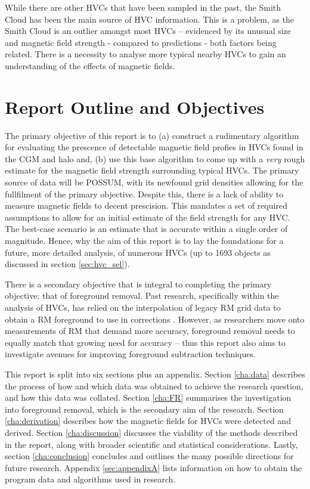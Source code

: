 While there are other HVCs that have been sampled in the past, the Smith Cloud has been the main source of HVC information. This is a problem, as the Smith Cloud is an outlier amongst most HVCs – evidenced by its unusual size and magnetic field strength - compared to predictions - both factors being related. There is a necessity to analyse more typical nearby HVCs to gain an understanding of the effects of magnetic fields.

\section{Report Outline and Objectives}
\label{sec:outline}

The primary objective of this report is to (a) construct a rudimentary algorithm for evaluating the prescence of detectable magnetic field profies in HVCs found in the CGM and halo and, (b) use this base algorithm to come up with a \textit{very} rough estimate for the magnetic field strength surrounding typical HVCs. The primary source of data will be POSSUM, with its newfound grid densities allowing for the fullfilment of the primary objective. Despite this, there is a lack of ability to measure magnetic fields to decent prescision. This mandates a set of required assumptions to allow for an initial estimate of the field strength for any HVC. The best-case scenario is an estimate that is accurate within a single order of magnitude. Hence, why the aim of this report is to lay the foundations for a future, more detailed analysis, of numerous HVCs (up to 1693 objects as discussed in section \ref{sec:hvc_sel}).


There is a secondary objective that is integral to completing the primary objective: that of foreground removal. Past research, specifically within the analysis of HVCs, has relied on the interpolation of legacy RM grid data to obtain a RM foreground to use in corrections \citep{ID21, ID26}. However, as researchers move onto measurements of RM that demand more accuracy, foreground removal needs to equally match that growing need for accuracy – thus this report also aims to investigate avenues for improving foreground subtraction techniques.


This report is split into six sections plus an appendix. Section \ref{cha:data} describes the process of how and which data was obtained to achieve the research question, and how this data was collated. Section \ref{cha:FR} summarises the investigation into foreground removal, which is the secondary aim of the research. Section \ref{cha:derivation} describes how the magnetic fields for HVCs were detected and derived. Section \ref{cha:discussion} discusses the viability of the methods described in the report, along with broader scientific and statistical considerations. Lastly, section \ref{cha:conclusion} concludes and outlines the many possible directions for future research. Appendix \ref{sec:appendixA} lists information on how to obtain the program data and algorithms used in research.
